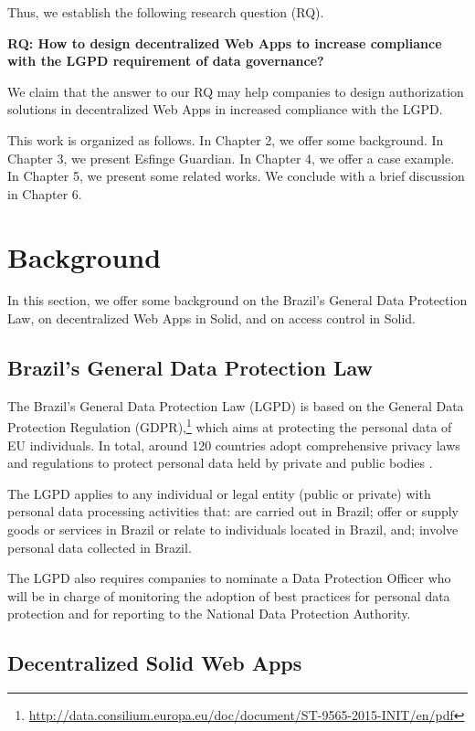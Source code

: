 \documentclass[sigconf]{acmart}
\begin{document}
Thus, we establish the following research question (RQ).

\vspace{0.15cm}
\noindent \textbf{RQ: How to design decentralized Web Apps to increase compliance with the LGPD requirement of data governance?}
\vspace{0.15cm}

We claim that the answer to our RQ may help companies to design authorization solutions in decentralized Web Apps in increased compliance with the LGPD.

This work is organized as follows. In Chapter 2, we offer some background. In Chapter 3, we present Esfinge Guardian. In Chapter 4, we offer a case example. In Chapter 5, we present some related works. We conclude with a brief discussion in Chapter 6.


\section{Background}
In this section, we offer some background on the Brazil's General Data Protection Law, on decentralized Web Apps in Solid, and on access control in Solid.

\subsection{Brazil's General Data Protection Law}

The Brazil's General Data Protection Law (LGPD) is based on the General Data Protection Regulation (GDPR),\footnote{\url{http://data.consilium.europa.eu/doc/document/ST-9565-2015-INIT/en/pdf}} which aims at protecting the personal data of EU individuals. In total, around 120 countries adopt comprehensive privacy laws and regulations to protect personal data held by private and public bodies \cite{Banisar2011}.

The LGPD applies to any individual or legal entity (public or private) with personal data processing activities that: are carried out in Brazil; offer or supply goods or services in Brazil or relate to individuals located in Brazil, and; involve personal data collected in Brazil.

The LGPD also requires companies to nominate a Data Protection Officer who will be in charge of monitoring the adoption of best practices for personal data protection and for reporting to the National Data Protection Authority.

\subsection{Decentralized Solid Web Apps}
\end{document}
